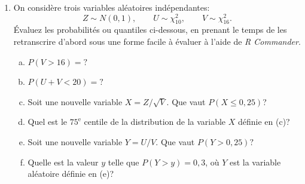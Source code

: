 \documentclass[12pt]{article}
\begin{document}
\begin{enumerate}
\item On considère trois variables aléatoires  indépendantes:  $$Z\sim N(0,1),\qquad U\sim\chi^2_{10},\qquad V\sim\chi^2_{16}.$$
    Évaluez les probabilités ou quantiles ci-dessous, en prenant le temps de les retranscrire d'abord sous une forme facile à évaluer à l'aide de {\it R Commander}.
\begin{enumerate}[(a)]
\item $P(V>16)=?$
\item $P(U+V<20)=?$
\item Soit une nouvelle variable $X=Z/\sqrt{V}$. Que vaut $P(X\le 0,25)$?
\item  Quel est le $75^{\text{e}}$ centile de la distribution de la variable $X$ définie en (c)?
\item  Soit une nouvelle variable $Y=U/V$. Que vaut $P(Y> 0,25)?$
\item  Quelle est la valeur $y$ telle que $P(Y>y)=0,3$, où $Y$ est la variable aléatoire définie en (e)?
\end{enumerate}


\newpage

{\ }
\vspace{3mm}

\end{enumerate}
\end{document}

